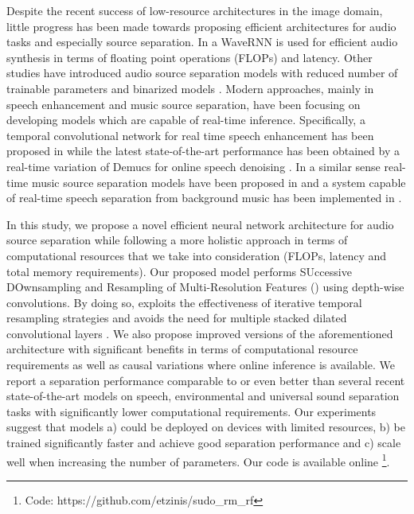 Despite the recent success of low-resource architectures in the image domain, little progress has been made towards proposing efficient architectures for audio tasks and especially source separation. In \cite{kalchbrenner2018efficient_audiosynthesis} a WaveRNN is used for efficient audio synthesis in terms of floating point operations (FLOPs) and latency. Other studies have introduced audio source separation models with reduced number of trainable parameters \cite{luo2019dual,maldonado2020lightweight,luo2020groupcomm} and binarized models \cite{kim2018bitwise}. Modern approaches, mainly in speech enhancement and music source separation, have been focusing on developing models which are capable of real-time inference. Specifically, a temporal convolutional network for real time speech enhancement has been proposed in \cite{pandey2019tcnnRealTimeSpeechEnhancement} while the latest state-of-the-art performance has been obtained by a real-time variation of Demucs for online speech denoising \cite{defossez2020realtimedemucs}. In a similar sense real-time music source separation models have been proposed in \cite{hennequin2020spleeterRealTimeMusicSep} and a system capable of real-time speech separation from background music has been implemented in \cite{kaspersen2020hydranetRealTimeSpeechFromMusic}.

In this study, we propose a novel efficient neural network architecture for audio source separation while following a more holistic approach in terms of computational resources that we take into consideration (FLOPs, latency and total memory requirements). Our proposed model performs SUccessive DOwnsampling and Resampling of Multi-Resolution Features (\sudodot) using depth-wise convolutions. By doing so, \sudo exploits the effectiveness of iterative temporal resampling strategies \cite{haris2018deepbackprojectionSuperResolution} and avoids the need for multiple stacked dilated convolutional layers \cite{luo2019convTasNet}. We also propose improved versions of the aforementioned architecture with significant benefits in terms of computational resource requirements as well as causal variations where online inference is available. We report a separation performance comparable to or even better than several recent state-of-the-art models on speech, environmental and universal sound separation tasks with significantly lower computational requirements. Our experiments suggest that \sudo models a) could be deployed on devices with limited resources, b) be trained significantly faster and achieve good separation performance and c) scale well when increasing the number of parameters. Our code is available online \footnote{Code: https://github.com/etzinis/sudo\_rm\_rf}.


